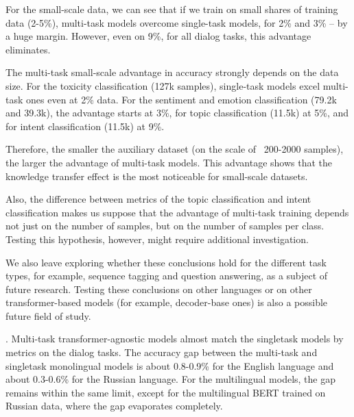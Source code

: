 For the small-scale data, we can see that if we train on small shares of training data (2-5\%), multi-task models overcome single-task models, for 2\% and 3\% -- by a huge margin. However, even on 9\%, for all dialog tasks, this advantage eliminates.

The multi-task small-scale advantage in accuracy strongly depends on the data size. For the toxicity classification (127k samples), single-task models excel multi-task ones even at 2\% data. For the sentiment and emotion classification (79.2k and 39.3k), the advantage starts at 3\%, for topic classification (11.5k) at 5\%, and for intent classification (11.5k) at 9\%. 

Therefore, the smaller the auxiliary dataset (on the scale of ~200-2000 samples), the larger the advantage of multi-task models. This advantage shows that the knowledge transfer effect is the most noticeable for small-scale datasets.

Also, the difference between metrics of the topic classification and intent classification makes us suppose that the advantage of multi-task training depends not just on the number of samples, but on the number of samples per class. Testing this hypothesis, however, might require additional investigation. 

We also leave exploring whether these conclusions hold for the different task types, for example, sequence tagging and question answering, as a subject of future research. Testing these 
conclusions on other languages or on other transformer-based models (for example, decoder-base ones)  is also a possible future field of study.

.
Multi-task transformer-agnostic models almost match the singletask models by metrics on the dialog tasks. The accuracy gap between the multi-task and singletask monolingual models is about 0.8-0.9\% for the English language and about 0.3-0.6\% for the Russian language. For the multilingual models, the gap remains within the same limit, except for the multilingual BERT trained on Russian data, where the gap evaporates completely.


